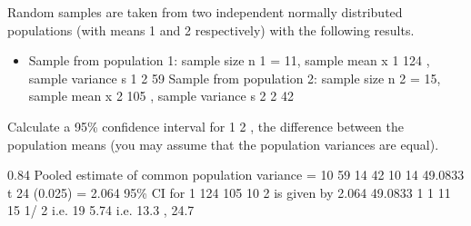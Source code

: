 \documentclass[a4paper,12pt]{article}
\begin{document}
Random samples are taken from two independent normally distributed populations
(with means 1 and 2 respectively) with the following results.
\begin{itemize}
    \item Sample from population 1:
sample size n 1 = 11, sample mean x 1 124 , sample variance s 1 2
59
Sample from population 2:
sample size n 2 = 15, sample mean x 2 105 , sample variance s 2 2
42
\end{itemize}

Calculate a 95\%  confidence interval for 1
2 , the difference between the
population means (you may assume that the population variances are equal).



0.84
Pooled estimate of common population variance =
10 59
14 42
10 14
49.0833
t 24 (0.025) = 2.064
95\%  CI for
1
124 105
10
2
is given by
2.064
49.0833
1 1
11 15
1/ 2
i.e. 19 5.74 i.e. 13.3 , 24.7
\end{document}
